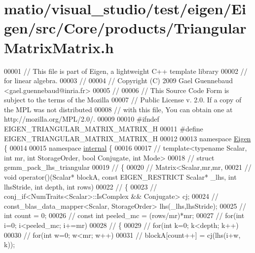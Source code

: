 \hypertarget{matio_2visual__studio_2test_2eigen_2_eigen_2src_2_core_2products_2_triangular_matrix_matrix_8h_source}{}\section{matio/visual\+\_\+studio/test/eigen/\+Eigen/src/\+Core/products/\+Triangular\+Matrix\+Matrix.h}
\label{matio_2visual__studio_2test_2eigen_2_eigen_2src_2_core_2products_2_triangular_matrix_matrix_8h_source}

\begin{DoxyCode}
00001 \textcolor{comment}{// This file is part of Eigen, a lightweight C++ template library}
00002 \textcolor{comment}{// for linear algebra.}
00003 \textcolor{comment}{//}
00004 \textcolor{comment}{// Copyright (C) 2009 Gael Guennebaud <gael.guennebaud@inria.fr>}
00005 \textcolor{comment}{//}
00006 \textcolor{comment}{// This Source Code Form is subject to the terms of the Mozilla}
00007 \textcolor{comment}{// Public License v. 2.0. If a copy of the MPL was not distributed}
00008 \textcolor{comment}{// with this file, You can obtain one at http://mozilla.org/MPL/2.0/.}
00009 
00010 \textcolor{preprocessor}{#ifndef EIGEN\_TRIANGULAR\_MATRIX\_MATRIX\_H}
00011 \textcolor{preprocessor}{#define EIGEN\_TRIANGULAR\_MATRIX\_MATRIX\_H}
00012 
00013 \textcolor{keyword}{namespace }\hyperlink{namespace_eigen}{Eigen} \{ 
00014 
00015 \textcolor{keyword}{namespace }\hyperlink{namespaceinternal}{internal} \{
00016 
00017 \textcolor{comment}{// template<typename Scalar, int mr, int StorageOrder, bool Conjugate, int Mode>}
00018 \textcolor{comment}{// struct gemm\_pack\_lhs\_triangular}
00019 \textcolor{comment}{// \{}
00020 \textcolor{comment}{//   Matrix<Scalar,mr,mr,}
00021 \textcolor{comment}{//   void operator()(Scalar* blockA, const EIGEN\_RESTRICT Scalar* \_lhs, int lhsStride, int depth, int rows)}
00022 \textcolor{comment}{//   \{}
00023 \textcolor{comment}{//     conj\_if<NumTraits<Scalar>::IsComplex && Conjugate> cj;}
00024 \textcolor{comment}{//     const\_blas\_data\_mapper<Scalar, StorageOrder> lhs(\_lhs,lhsStride);}
00025 \textcolor{comment}{//     int count = 0;}
00026 \textcolor{comment}{//     const int peeled\_mc = (rows/mr)*mr;}
00027 \textcolor{comment}{//     for(int i=0; i<peeled\_mc; i+=mr)}
00028 \textcolor{comment}{//     \{}
00029 \textcolor{comment}{//       for(int k=0; k<depth; k++)}
00030 \textcolor{comment}{//         for(int w=0; w<mr; w++)}
00031 \textcolor{comment}{//           blockA[count++] = cj(lhs(i+w, k));}

\end{DoxyCode}
